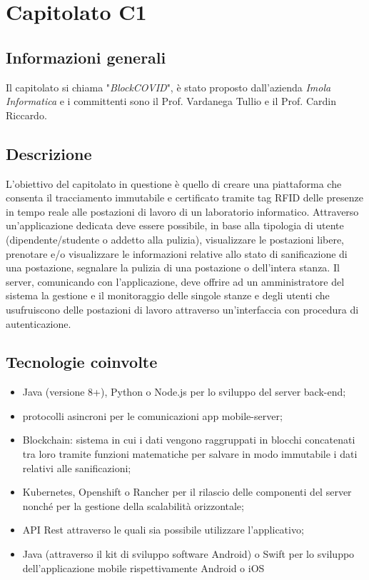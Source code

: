 \section{Capitolato C1}

\subsection{Informazioni generali}{

Il capitolato si chiama "\textit{BlockCOVID}", è stato proposto dall'azienda \textit{Imola Informatica} e i committenti sono il Prof. Vardanega Tullio e il Prof. Cardin Riccardo.
}

\subsection{Descrizione}{
L'obiettivo del capitolato in questione è quello di creare una piattaforma che consenta il tracciamento immutabile e certificato tramite tag RFID delle presenze in tempo reale alle postazioni di lavoro di un laboratorio informatico. Attraverso un'applicazione dedicata deve essere possibile, in base alla tipologia di utente (dipendente/studente o addetto alla pulizia), visualizzare le postazioni libere, prenotare e/o visualizzare le informazioni relative allo stato di sanificazione di una postazione, segnalare la pulizia di una postazione o dell'intera stanza. Il server, comunicando con l'applicazione, deve offrire ad un amministratore del sistema la gestione e il monitoraggio delle singole stanze e degli utenti che usufruiscono delle postazioni di lavoro attraverso un'interfaccia con procedura di autenticazione.

}

\subsection{Tecnologie coinvolte}{
\begin{itemize}
\item Java (versione 8+), Python o Node.js per lo sviluppo del server back-end;
\item protocolli asincroni per le comunicazioni app mobile-server;
\item Blockchain: sistema in cui i dati vengono raggruppati in blocchi concatenati tra loro tramite funzioni matematiche per salvare in modo immutabile i dati relativi alle sanificazioni;
\item Kubernetes, Openshift o Rancher per il rilascio delle componenti
del server nonché per la gestione della scalabilità orizzontale;
\item API Rest attraverso le quali sia possibile utilizzare l'applicativo;

\item Java (attraverso il kit di sviluppo software Android) o Swift per lo sviluppo dell'applicazione mobile rispettivamente Android o iOS
\end{itemize}
}

